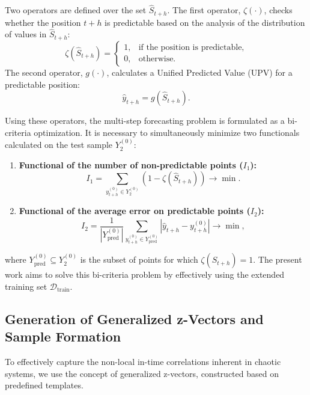 \documentclass[a4paper,12pt]{extarticle}
\begin{document}
Two operators are defined over the set $\hat{S}_{t+h}$. The first operator,
 $\zeta(\cdot)$, checks whether the position $t+h$ is predictable based
 on the analysis of the distribution of values in $\hat{S}_{t+h}$:
\begin{equation}
\zeta(\hat{S}_{t+h}) =
\begin{cases}
1, & \text{if the position is predictable,} \\
0, & \text{otherwise.}
\end{cases}
\end{equation}
The second operator, $g(\cdot)$, calculates a Unified Predicted Value
(UPV) for a predictable position:
\begin{equation}
\hat{y}_{t+h} = g(\hat{S}_{t+h}).
\end{equation}

Using these operators, the multi-step forecasting problem
 is formulated as a bi-criteria optimization. It is necessary to simultaneously
 minimize two functionals calculated on the test sample $Y_2^{(0)}$:
\begin{enumerate}
    \item \textbf{Functional of the number of non-predictable points ($I_1$):}
    \begin{equation}
    I_1 = \sum_{y_{t+h}^{(0)} \in Y_2^{(0)}} \left( 1 - \zeta(\hat{S}_{t+h}) \right) \to \min.
    \end{equation}

    \item \textbf{Functional of the average error on predictable points ($I_2$):}
    \begin{equation}
    I_2 = \frac{1}{|Y_{\text{pred}}^{(0)}|} \sum_{y_{t+h}^{(0)} \in Y_{\text{pred}}^{(0)}} \left| \hat{y}_{t+h} - y_{t+h}^{(0)} \right| \to \min,
    \end{equation}
\end{enumerate}
where $Y_{\text{pred}}^{(0)} \subseteq Y_2^{(0)}$ is the subset of points for
 which $\zeta(\hat{S}_{t+h}) = 1$. The present work aims to solve
  this bi-criteria problem by effectively using the extended
   training set $\mathcal{D}_{\text{train}}$.

\subsection{Generation of Generalized z-Vectors and Sample Formation}

To effectively capture the non-local in-time correlations inherent in chaotic systems,
 we use the concept of generalized z-vectors, constructed based on predefined templates.
\end{document}
